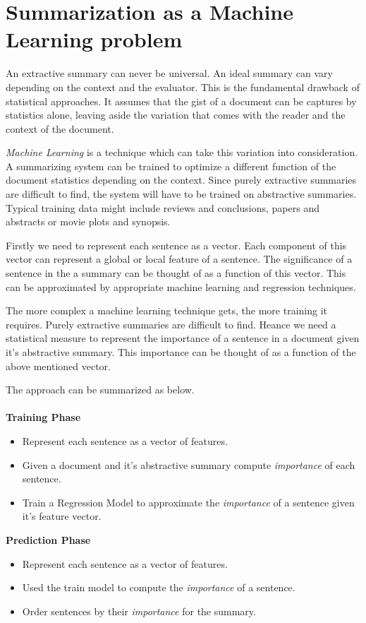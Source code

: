 \documentclass[paper=a4, fontsize=11pt]{scrartcl} %
\numberwithin{equation}{section} %
\numberwithin{figure}{section} %
\numberwithin{table}{section} %
\begin{document}

\section{Summarization as a Machine Learning problem}
An extractive summary can never be universal. An ideal summary can vary depending on the context and the evaluator. This is the fundamental drawback of statistical approaches. It assumes that the gist of a document can be captures by statistics alone, leaving aside the variation that comes with the reader and the context of the document.\\
\par
\emph{Machine Learning} is a technique which can take this variation into consideration. A summarizing system can be trained to optimize a different function of the document statistics depending on the context. Since purely extractive summaries are difficult to find, the system will have to be trained on abstractive summaries. Typical training data might include reviews and conclusions, papers and abstracts or movie plots and synopsis.\\
\par
Firstly we need to represent each sentence as a vector. Each component of this vector can represent a global or local feature of a sentence. The significance of a sentence in the a summary can be thought of as a function of this vector. This can be approximated by appropriate machine learning and regression techniques. \\
\par
The more complex a machine learning technique gets, the more training it requires. Purely extractive summaries are difficult to find. Heance we need a statistical measure to represent the importance of a sentence in a document given it's abstractive summary. This importance can be thought of as a function of the above mentioned vector. \\
\par
The approach can be summarized as below.\\
\\
\textbf{ Training Phase }
	\begin{itemize}
		\item Represent each sentence as a vector of features.
		\item Given a document and it's abstractive summary compute \emph{importance} of each sentence.
		\item Train a Regression Model to approximate the \emph{importance} of a sentence given it's feature vector.
	\end{itemize}

\textbf{ Prediction Phase }
	\begin{itemize}
		\item Represent each sentence as a vector of features.
		\item Used the train model to compute the \emph{importance} of a sentence.
		\item Order sentences by their \emph{importance} for the summary.
	\end{itemize}



{}

\end{document}
